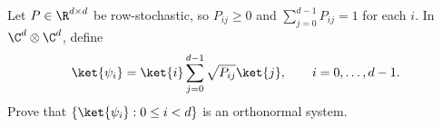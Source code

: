Let $P\in\R^{d\times d}$ be row-stochastic, so $P_{ij}\geq0$ and $\sum_{j=0}^{d-1}P_{ij}=1$ for each $i$.  In $\C^d\otimes\C^d$, define
$$
    \ket{\psi_i}=\ket{i}\sum_{j=0}^{d-1}\sqrt{P_{ij}}\ket{j},
    \qquad i=0,
    \dots,d-1.
$$
Prove that $\{\ket{\psi_i}:0\leq i<d\}$ is an orthonormal system.
